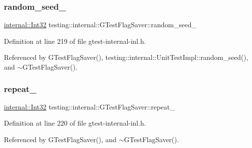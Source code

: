 \subsubsection{\texorpdfstring{random\+\_\+seed\+\_\+}{random\_seed\_}}
{\footnotesize\ttfamily \hyperlink{namespacetesting_1_1internal_a8ee38faaf875f133358abaf9bc056cec}{internal\+::\+Int32} testing\+::internal\+::\+G\+Test\+Flag\+Saver\+::random\+\_\+seed\+\_\+\hspace{0.3cm}{\ttfamily [private]}}



Definition at line 219 of file gtest-\/internal-\/inl.\+h.



Referenced by G\+Test\+Flag\+Saver(), testing\+::internal\+::\+Unit\+Test\+Impl\+::random\+\_\+seed(), and $\sim$\+G\+Test\+Flag\+Saver().

\mbox{\label{classtesting_1_1internal_1_1GTestFlagSaver_a4c6949cb53b5a89568649d34f8abb5f6}} 
\subsubsection{\texorpdfstring{repeat\+\_\+}{repeat\_}}
{\footnotesize\ttfamily \hyperlink{namespacetesting_1_1internal_a8ee38faaf875f133358abaf9bc056cec}{internal\+::\+Int32} testing\+::internal\+::\+G\+Test\+Flag\+Saver\+::repeat\+\_\+\hspace{0.3cm}{\ttfamily [private]}}



Definition at line 220 of file gtest-\/internal-\/inl.\+h.



Referenced by G\+Test\+Flag\+Saver(), and $\sim$\+G\+Test\+Flag\+Saver().

\mbox{\label{classtesting_1_1internal_1_1GTestFlagSaver_af69cb62f7ee26542dd8588507142b478}} 
